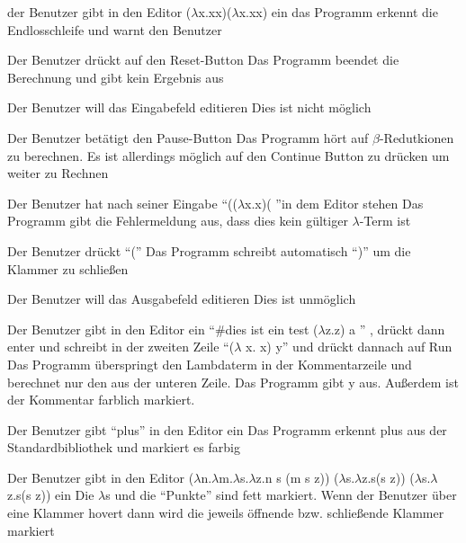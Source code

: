 \documentclass[parskip=full,11pt,twoside]{scrartcl}
\begin{document}
{der Benutzer gibt in den Editor ($\lambda$x.xx)($\lambda$x.xx) ein }
{ das Programm erkennt die Endlosschleife und warnt den Benutzer }

{Der Benutzer drückt auf den Reset-Button}
{ Das Programm beendet die Berechnung und gibt kein Ergebnis aus }

{Der Benutzer will das Eingabefeld editieren}
{Dies ist nicht möglich}

{Der Benutzer betätigt den Pause-Button}
{Das Programm hört auf $\beta$-Redutkionen zu berechnen. Es ist allerdings möglich auf den Continue Button zu drücken um weiter zu Rechnen}

{ Der Benutzer hat nach seiner Eingabe \enquote{(($\lambda$x.x)( }in dem Editor stehen  }
{ Das Programm gibt die Fehlermeldung aus, dass dies kein gültiger $\lambda$-Term ist }

{Der Benutzer drückt \enquote{(}}
{Das Programm schreibt automatisch \enquote{)} um die Klammer zu schließen}

{Der Benutzer will das Ausgabefeld editieren}
{Dies ist unmöglich}

{Der Benutzer gibt in den Editor ein \enquote{\#dies ist ein test ($\lambda$z.z) a } , drückt dann enter und schreibt in der zweiten Zeile
\newline \enquote{($\lambda$ x. x) y}  und drückt dannach auf Run}
{Das Programm überspringt den Lambdaterm in der Kommentarzeile und berechnet nur den aus der unteren Zeile. Das Programm gibt y aus.
Außerdem ist der Kommentar farblich markiert. }



{Der Benutzer gibt \enquote{plus} in den Editor ein}
{Das Programm erkennt plus aus der Standardbibliothek und markiert es farbig}

{Der Benutzer gibt in den Editor \newline ($\lambda$n.$\lambda$m.$\lambda$s.$\lambda$z.n s (m s z)) ($\lambda$s.$\lambda$z.s(s z)) ($\lambda$s.$\lambda$z.s(s z)) ein }
{Die $\lambda$s und die \enquote{Punkte} sind fett markiert. Wenn der Benutzer über eine Klammer hovert dann wird die jeweils öffnende bzw. schließende Klammer markiert  }
\end{document}
